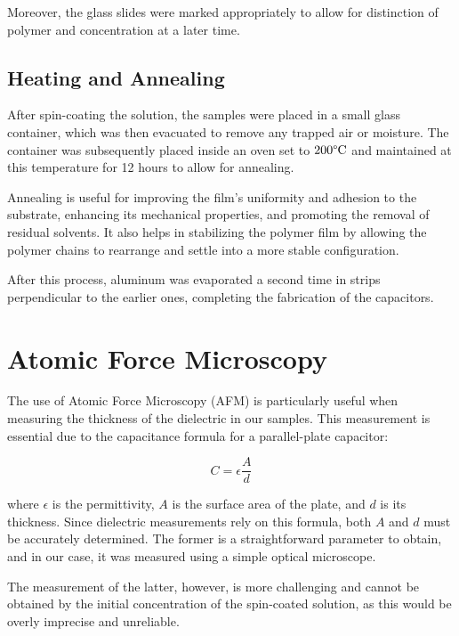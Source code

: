 Moreover, the glass slides were marked appropriately to allow for distinction of polymer and concentration at a later time.

\subsection{Heating and Annealing}

After spin-coating the solution, the samples were placed in a small glass container, which was then evacuated to remove any trapped air or moisture. The container was subsequently placed inside an oven set to $200 \degree \text{C}$ and maintained at this temperature for 12 hours to allow for annealing.

Annealing is useful for improving the film's uniformity and adhesion to the substrate, enhancing its mechanical properties, and promoting the removal of residual solvents. It also helps in stabilizing the polymer film by allowing the polymer chains to rearrange and settle into a more stable configuration.


After this process, aluminum was evaporated a second time in strips perpendicular to the earlier ones, completing the fabrication of the capacitors.


\section{Atomic Force Microscopy}

The use of Atomic Force Microscopy (AFM) is particularly useful when measuring the thickness of the dielectric in our samples. This measurement is essential due to the capacitance formula for a parallel-plate capacitor:

\[
C = \epsilon \frac{A}{d}
\]

where $\epsilon$ is the permittivity, $A$ is the surface area of the plate, and $d$ is its thickness. Since dielectric measurements rely on this formula, both $A$ and $d$ must be accurately determined. The former is a straightforward parameter to obtain, and in our case, it was measured using a simple optical microscope. %


The measurement of the latter, however, is more challenging and cannot be obtained by the initial concentration of the spin-coated solution, as this would be overly imprecise and unreliable.

